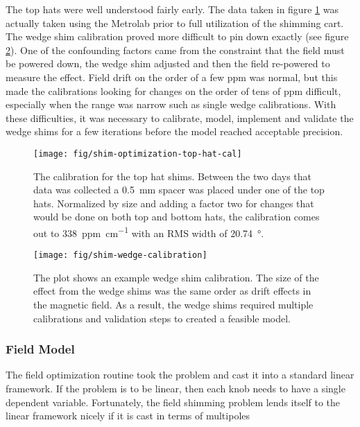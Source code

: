 The top hats were well understood fairly early.  The data taken in figure \ref{fig:shim-optimization-top-hat-cal} was actually taken using the Metrolab prior to full utilization of the shimming cart.  The wedge shim calibration proved more difficult to pin down exactly (see figure \ref{fig:shim-wedge-calibration}).  One of the confounding factors came from the constraint that the field must be powered down, the wedge shim adjusted and then the field re-powered to measure the effect.  Field drift on the order of a few ppm was normal, but this made the calibrations looking for changes on the order of tens of ppm difficult, especially when the range was narrow such as single wedge calibrations.  With these difficulties, it was necessary to calibrate, model, implement and validate the wedge shims for a few iterations before the model reached acceptable precision.

\begin{figure}
\centering
\texttt{[image: fig/shim-optimization-top-hat-cal]}
\caption{
    The calibration for the top hat shims.  Between the two days that data was collected a \SI{0.5}{\milli\meter} spacer was placed under one of the top hats.  Normalized by size and adding a factor two for changes that would be done on both top and bottom hats, the calibration comes out to \SI{338}{ppm\per\centi\meter} with an RMS width of \SI{20.74}{\degree}. 
    \label{fig:shim-optimization-top-hat-cal}
}
\end{figure}

\begin{figure}
\centering
\texttt{[image: fig/shim-wedge-calibration]}
\caption{
    The plot shows an example wedge shim calibration.  The size of the effect from the wedge shims was the same order as drift effects in the magnetic field.  As a result, the wedge shims required multiple calibrations and validation steps to created a feasible model.
    \label{fig:shim-wedge-calibration}
}
\end{figure}

\subsubsection{Field Model}

The field optimization routine took the problem and cast it into a standard linear framework.  If the problem is to be linear, then each knob needs to have a single dependent variable.  Fortunately, the field shimming problem lends itself to the linear framework nicely if it is cast in terms of multipoles

